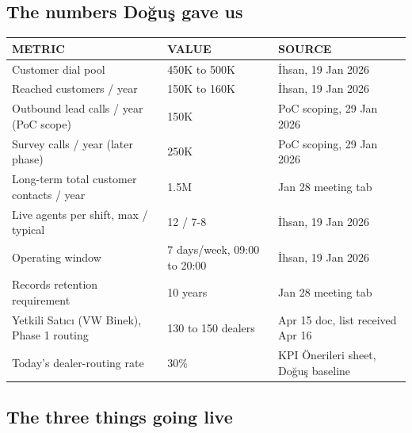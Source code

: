 \documentclass[10pt,a4paper]{article}
\begin{document}
\subsection{The numbers Doğuş gave us}

\begin{tabularx}{\linewidth}{@{}L{6.0cm}L{4.5cm}L{4.0cm}@{}}
\toprule
{}\textbf{\color{white}\footnotesize METRIC} & \textbf{\color{white}\footnotesize VALUE} & \textbf{\color{white}\footnotesize SOURCE} \\
\midrule
Customer dial pool                          & 450K to 500K               & İhsan, 19 Jan 2026 \\
Reached customers / year                    & 150K to 160K              & İhsan, 19 Jan 2026 \\
Outbound lead calls / year (PoC scope)      & 150K                       & PoC scoping, 29 Jan 2026 \\
Survey calls / year (later phase)           & 250K                       & PoC scoping, 29 Jan 2026 \\
Long-term total customer contacts / year    & 1.5M                       & Jan 28 meeting tab \\
Live agents per shift, max / typical        & 12 / 7-8                   & İhsan, 19 Jan 2026 \\
Operating window                            & 7 days/week, 09:00 to 20:00 & İhsan, 19 Jan 2026 \\
Records retention requirement               & 10 years                    & Jan 28 meeting tab \\
Yetkili Satıcı (VW Binek), Phase 1 routing  & 130 to 150 dealers          & Apr 15 doc, list received Apr 16 \\
Today's dealer-routing rate                 & 30\%                        & KPI Önerileri sheet, Doğuş baseline \\
\bottomrule
\end{tabularx}

\subsection{The three things going live}
\end{document}
